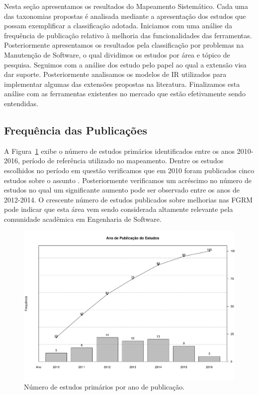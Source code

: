 Nesta seção apresentamos os resultados do Mapeamento Sistemático. Cada uma das
taxonomias propostas é analisada mediante a apresentação dos estudos que possam
exemplificar a classificação adotada.  Iniciamos com uma análise da frequência
de publicação relativo à melhoria das funcionalidades das ferramentas.
Posteriormente apresentamos os resultados pela classificação por problemas na
Manutenção de Software, o qual dividimos os estudos por área e tópico de
pesquisa. Seguimos com a análise dos estudo pelo papel ao qual a extensão visa
dar suporte. Posteriormente analisamos os modelos de IR utilizados para
implementar algumas das extensões propostas na literatura. Finalizamos esta
análise com as ferramentas existentes no mercado que estão efetivamente sendo
entendidas.

\subsection{Frequência das Publicações}
\label{sub:frequencia_publicacao}

A Figura~\ref{fig:publicacao_por_ano} exibe o número de estudos primários
identificados entre os anos 2010-2016, período de referência utilizado no
mapeamento. Dentre os estudos escolhidos no período em questão verificamos que
em 2010 foram publicados cinco estudos sobre o assunto
\cite{sun2010discriminative,gegick2010identifying,song2010jdf,nagwani2010predictive,zimmermann2010makes}.
Posteriormente verificamos um acréscimo no número de estudos no qual um
significante aumento pode ser observado entre os anos de 2012-2014. O crescente
número de estudos publicados sobre melhorias nas FGRM pode indicar que esta área
vem sendo considerada altamente relevante pela comunidade acadêmica em
Engenharia de Software.

\begin{figure}[htpb]
	\centering
	\includegraphics[width=0.9\linewidth]{chapter-mapeamento-sistematico/img/ano-publicao-estudos.pdf}
	\caption{Número de estudos primários por ano de publicação.}
	\label{fig:publicacao_por_ano}
\end{figure}

